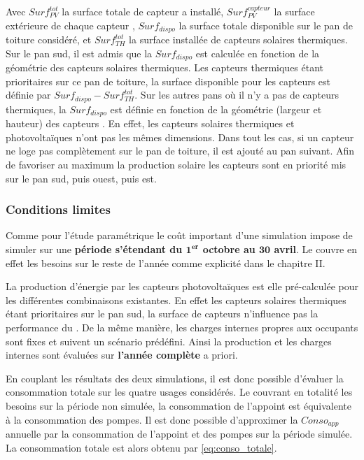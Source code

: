 Avec $Surf_{PV}^{tot}$ la surface totale de capteur  a installé,
$Surf_{PV}^{capteur}$ la surface extérieure de chaque capteur , $Surf_{dispo}$ la
surface totale disponible sur le pan de toiture considéré, et $Surf_{TH}^{tot}$ la surface
installée de capteurs solaires thermiques. Sur le pan sud, il est admis que
la $Surf_{dispo}$ est calculée en fonction de la géométrie des capteurs solaires
thermiques. Les capteurs thermiques étant prioritaires sur ce pan de toiture, la surface
disponible pour les capteurs  est définie par $Surf_{dispo} - Surf_{TH}^{tot}$.
Sur les autres pans où il n’y a pas de capteurs thermiques, la $Surf_{dispo}$ est
définie en fonction de la géométrie (largeur et hauteur) des capteurs . En effet,
les capteurs solaires thermiques et photovoltaïques n’ont pas les mêmes dimensions.
Dans tout les cas, si un capteur ne loge pas complètement sur le pan de toiture,
il est ajouté au pan suivant. Afin de favoriser au maximum la production solaire
les capteurs sont en priorité mis sur le pan sud, puis ouest, puis est.


\subsubsection{Conditions limites} %
\label{ssub:conditions_limites}
Comme pour l’étude paramétrique le coût important d’une simulation impose de simuler
sur une \textbf{période s’étendant du $\bm{1^{er}}$ octobre au $\bm{30}$ avril}. Le 
couvre en effet les besoins sur le reste de l’année comme explicité dans le chapitre II.

La production d’énergie par les capteurs photovoltaïques est elle pré-calculée pour
les différentes combinaisons existantes. En effet les capteurs solaires thermiques
étant prioritaires sur le pan sud, la surface de capteurs  n’influence
pas la performance du . De la même manière, les charges internes propres
aux occupants sont fixes et suivent un scénario prédéfini. Ainsi la production
 et les charges internes sont évaluées sur \textbf{l’année complète}
a priori.

En couplant les résultats des deux simulations, il est donc possible d’évaluer la
consommation totale sur les quatre usages considérés. Le  couvrant en totalité
les besoins sur la période non simulée, la consommation de l’appoint est équivalente à la
consommation des pompes. Il est donc possible d’approximer la $Conso_{app}$ annuelle par
la consommation de l’appoint et des pompes sur la période simulée. La consommation totale
est alors obtenu par \eqref{eq:conso_totale}.

